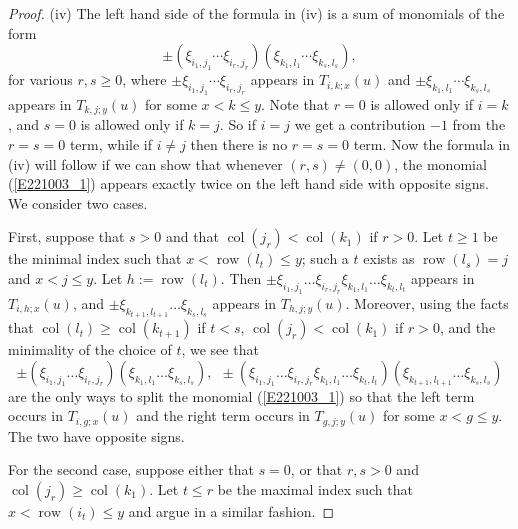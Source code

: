\documentclass[twoside,12pt,reqno]{amsart}
\def\row{\operatorname{row}}
\def\col{\operatorname{col}}
\begin{document}
\begin{proof}
(iv)
The left hand side of the formula in (iv)
is a sum of monomials of the form
\begin{equation}\label{E221003_1}
\pm (\xi_{i_1,j_1}\cdots \xi_{i_r,j_r})(\xi_{k_1,l_1}\cdots \xi_{k_s,l_s}),
\end{equation}
for various $r,s \geq 0$,
where
$\pm\xi_{i_1,j_1}\cdots \xi_{i_r,j_r}$ appears in $T_{i,k;x}(u)$ and
$\pm\xi_{k_1,l_1}\cdots \xi_{k_s,l_s}$ appears in $T_{k,j;y}(u)$ 
for some $x < k \leq y$. 
Note that $r=0$ is allowed only if $i=k$, and $s=0$ is allowed
only if $k=j$. So if $i=j$ we get a contribution $-1$ from the 
$r=s=0$ term, while if $i \neq j$ then there is no $r=s=0$
term.
Now the formula in (iv) will follow if we can show that
whenever $(r,s) \neq (0,0)$, the monomial 
(\ref{E221003_1}) appears exactly twice 
on the left hand side
with opposite signs. 
We consider
two cases. 

First, suppose that $s > 0$ and that
$\col(j_r) < \col(k_1)$ if $r > 0$. Let
 $t \geq 1$ be the minimal index such that $x < \row(l_t) \leq y$;
such a $t$ exists as $\row(l_s)=j$ and $x < j \leq y$. 
Let $h := \row(l_t)$.
Then
$\pm \xi_{i_1,j_1}\dots \xi_{i_r,j_r}\xi_{k_1,l_1}\dots \xi_{k_t,l_t}$
appears in $T_{i,h;x}(u)$, and
$\pm \xi_{k_{t+1},l_{t+1}}\dots \xi_{k_s,l_s}$
appears in $T_{h,j;y}(u)$.
Moreover, using the facts that 
$\col(l_t)  \geq \col(k_{t+1})$  if $t<s$,
$\col(j_r)<\col(k_1)$ if $r > 0$,
and the minimality of the choice of $t$, we see that
$$
\pm (\xi_{i_1,j_1}\dots \xi_{i_r,j_r})(\xi_{k_1,l_1}\dots \xi_{k_s,l_s}),\:\:
\pm (\xi_{i_1,j_1}\dots \xi_{i_r,j_r}\xi_{k_1,l_1}\dots \xi_{k_t,l_t})
(\xi_{k_{t+1},l_{t+1}}\dots \xi_{k_s,l_s})
$$
are the only ways to split the monomial (\ref{E221003_1}) so that the
left term occurs in $T_{i,g;x}(u)$ and the right term occurs in
$T_{g,j;y}(u)$ for some $x < g \leq y$. 
The two have opposite signs.

For the second case, suppose either that
$s=0$, or that $r,s>0$ and $\col(j_r)\geq \col(k_1)$. Let
 $t \leq r$ be the maximal index such that $x < \row(i_t) \leq y$
and argue in a similar fashion.
\iffalse
such a $t$ exists as $\row(i_1)=i$ and $x < i \leq y$. Let $h := \row(i_t)$.
Then
$\pm \xi_{i_1,j_1}\dots \xi_{i_{t-1},j_{t-1}}$
appears in $T_{i,h;x}(u)$, and
$\pm \xi_{i_t,j_t}\dots \xi_{i_r,j_r}\xi_{k_1,l_1}\dots  \xi_{k_s,l_s}$
appears in $T_{h,j;y}(u)$.
Moreover, using the facts that $\col(j_{t-1})< \col(i_t)$ if $t > 1$,
$\col(j_r)\geq \col(k_1)$ if $s > 0$,
and the maximality of the choice of $t$, we see that
$$
\pm (\xi_{i_1,j_1}\dots \xi_{i_r,j_r})(\xi_{k_1,l_1}\dots \xi_{k_s,l_s}),
\:\:
\pm (\xi_{i_1,j_1}\dots \xi_{i_{t-1},j_{t-1}})
(\xi_{i_t,j_t}\dots \xi_{i_r,j_r}\xi_{k_1,l_1}\dots  \xi_{k_s,l_s})
$$
are the only ways to split the monomial (\ref{E221003_1}) so that the
left term occurs in $T_{i,g;x}(u)$ and the right term occurs in
$T_{g,j;y}(u)$ for some $x < g \leq y$. 
It just remains to check that the two have opposite signs.
\fi\end{proof}
\end{document}
